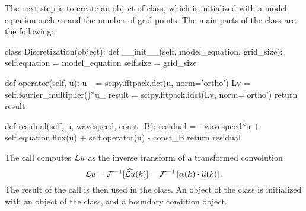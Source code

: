 The next step is to create an object of  class, which is initialized with a model equation such as  and the number of grid points. The main parts of the class are the following:
\begin{python}
class Discretization(object):
    def __init__(self, model_equation, grid_size):
        self.equation = model_equation
        self.size = grid_size

    def operator(self, u):
        u_ = scipy.fftpack.dct(u, norm='ortho')
        Lv = self.fourier_multiplier()*u_
        result = scipy.fftpack.idct(Lv, norm='ortho')
        return result

    def residual(self, u, wavespeed, const_B):
        residual = - wavespeed*u + self.equation.flux(u) 
                                        + self.operator(u) - const_B
        return  residual
\end{python}
The call  computes $\mathcal{L} u $ as the inverse transform of a transformed convolution 
\begin{equation}
\mathcal{L} u = \mathcal{F}^{-1}[ \widehat{\mathcal{L} u}(k)] = \mathcal{F}^{-1}\left[ \alpha(k)\cdot\widehat{u}(k)\right].
\end{equation}
The result of the call  is then used in the  class. 
An object of the  class is initialized with an object of the  class, and a boundary condition object.

